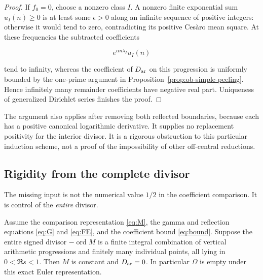 \begin{proof}
If \(f_0=0\), choose a nonzero class \(I\). A nonzero finite exponential sum \(u_I(n)\ge0\) is at least some \(\epsilon>0\) along an infinite sequence of positive integers: otherwise it would tend to zero, contradicting its positive Cesàro mean square. At these frequencies the subtracted coefficients

\begin{equation}\label{eq:ob3-24}
e^{\alpha n\lambda_I}u_I(n)
\end{equation}

tend to infinity, whereas the coefficient of \(D_{\rm ar}\) on this progression is uniformly bounded by the one-prime argument in Proposition~\ref{prop:ob-simple-peeling}. Hence infinitely many remainder coefficients have negative real part. Uniqueness of generalized Dirichlet series finishes the proof. \end{proof}

The argument also applies after removing both reflected boundaries, because each has a positive canonical logarithmic derivative. It supplies no replacement positivity for the interior divisor. It is a rigorous obstruction to this particular induction scheme, not a proof of the impossibility of other off-central reductions.

\subsection{Rigidity from the complete divisor}

The missing input is not the numerical value \(1/2\) in the coefficient comparison. It is control of the \emph{entire} divisor.

\begin{proposition}\label{prop:ob-global}

Assume the comparison representation \eqref{eq:M}, the gamma and reflection equations \eqref{eq:G} and \eqref{eq:FE}, and the coefficient bound \eqref{eq:bound}. Suppose the entire signed divisor \(-\operatorname{ord}M\) is a finite integral combination of vertical arithmetic progressions and finitely many individual points, all lying in \(0<\Re s<1\). Then \(M\) is constant and \(D_{\rm ar}=0\). In particular \(\Omega\) is empty under this exact Euler representation.

\end{proposition}

